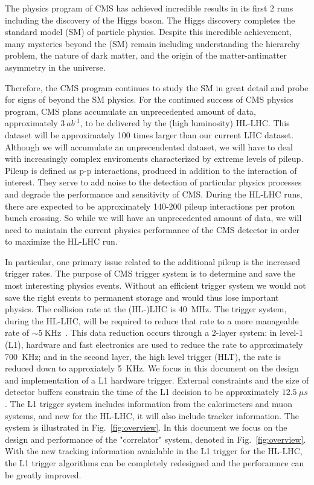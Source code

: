 The physics program of CMS has achieved incredible results in its first 2 runs including the discovery of the Higgs boson.
The Higgs discovery completes the standard model (SM) of particle physics.  
Despite this incredible achievement, many mysteries beyond the (SM) remain including understanding the hierarchy problem,
the nature of dark matter, and the origin of the matter-antimatter asymmetry in the universe.  

Therefore, the CMS program continues to study the SM in great detail and probe for signs of beyond the SM physics.  
For the continued success of CMS physics program, CMS plans accumulate an unprecedented amount of data, approximately $3~ab^\text{-1}$, to be delivered by the (high luminosity) HL-LHC.  
This dataset will be approximately 100 times larger than our current LHC dataset.  
Although we will accumulate an unprecendented dataset, we will have to deal with increasingly complex enviroments characterized by
extreme levels of pileup.  
Pileup is defined as p-p interactions, produced in addition to the interaction of interest.
They serve to add noise to the detection of particular physics processes and degrade the performance and sensitivity of CMS.
During the HL-LHC runs, there are expected to be approximately 140-200 pileup interactions per proton bunch crossing. 
So while we will have an unprecedented amount of data, we will need to maintain the current physics performance of the CMS detector in order to maximize the HL-LHC run.

In particular, one primary issue related to the additional pileup is the increased trigger rates.  
The purpose of CMS trigger system is to determine and save the most interesting physics events.
Without an efficient trigger system we would not save the right events to permanent storage and would thus lose important physics. 
The collision rate at the (HL-)LHC is 40~MHz.  
The trigger system, during the HL-LHC, will be required to reduce that rate to a more manageable rate of $\sim5~$KHz~\cite{Contardo:2020886}.  
This data reduction occurs through a 2-layer system: in level-1 (L1), hardware and fast electronics are used to reduce the rate to approximately 700~KHz; and in the second layer, the high level trigger (HLT), the rate is reduced down to approxiately 5~KHz.  
We focus in this document on the design and implementation of a L1 hardware trigger.  
External constraints and the size of detector buffers constrain the time of the L1 decision to be approximately $12.5~\mu s$.  
The L1 trigger system includes information from the calorimeters and muon systems, and new for the HL-LHC, it will also include tracker information.  
The system is illustrated in Fig.~\ref{fig:overview}.
In this document we focus on the design and performance of the "correlator" system, denoted in Fig.~\ref{fig:overview}.
With the new tracking information avaialable in the L1 trigger for the HL-LHC, the L1 trigger algorithms can be completely 
redesigned and the perforamnce can be greatly improved.

